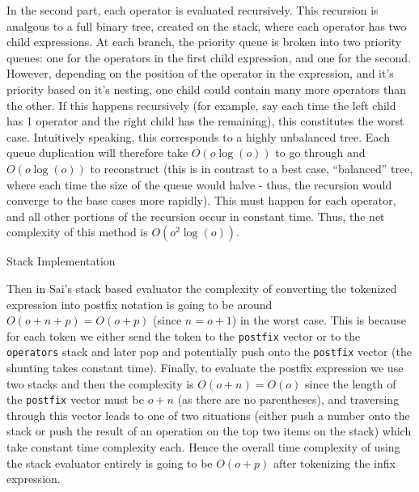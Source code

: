 \documentclass[11pt]{article}
\begin{document}
In the second part, each operator is evaluated recursively.
This recursion is analgous to a full binary tree, created on the stack, where each operator has two child expressions.
At each branch, the priority queue is broken into two priority queues: one for the operators in the first child expression, and one for the second.
However, depending on the position of the operator in the expression, and it's priority based on it's nesting, one child could contain many more operators than the other.
If this happens recursively (for example, say each time the left child has 1 operator and the right child has the remaining), this constitutes the worst case.
Intuitively speaking, this corresponds to a highly unbalanced tree.
Each queue duplication will therefore take $O(o\log(o))$ to go through and $O(o\log(o))$ to reconstruct (this is in contrast to a best case, ``balanced'' tree, where each time the size of the queue would halve - thus, the recursion would converge to the base cases more rapidly).
This must happen for each operator, and all other portions of the recursion occur in constant time.
Thus, the net complexity of this method is $O(o^2\log(o))$.

\centerline{Stack Implementation}
Then in Sai's stack based evaluator the complexity of converting the tokenized expression into postfix notation is going to be around $O(o+n+p) = O(o+p)$ (since $n=o+1$) in the worst case.
This is because for each token we either send the token to the \texttt{postfix} vector or to the \texttt{operators} stack and later pop and potentially push onto the \texttt{postfix} vector (the shunting takes constant time).
Finally, to evaluate the postfix expression we use two stacks and then the complexity is $O(o+n) = O(o)$ since the length of the \texttt{postfix} vector must be $o+n$ (as there are no parentheses), and traversing through this vector leads to one of two situations (either push a number onto the stack or push the result of an operation on the top two items on the stack) which take constant time complexity each.
Hence the overall time complexity of using the stack evaluator entirely is going to be $O(o+p)$ after tokenizing the infix expression.
\end{document}
